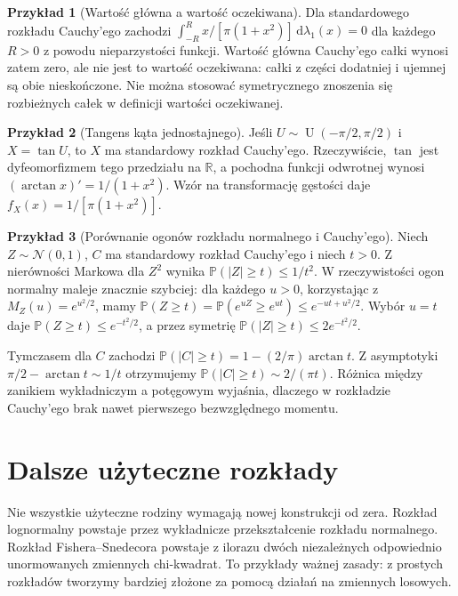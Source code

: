 \documentclass[11pt,a4paper,oneside]{report}
\numberwithin{equation}{chapter}
\theoremstyle{plain}
\theoremstyle{definition}
\newtheorem{przyklad}{Przykład}[chapter]
\theoremstyle{remark}
\newcommand{\R}{\mathbb{R}}
\newcommand{\Prob}{\mathbb{P}}
\newcommand{\dd}{\mathrm{d}}
\newcommand{\Unif}{\operatorname{U}}
\newcommand{\Normal}{\mathcal{N}}
\begin{document}
\begin{przyklad}[Wartość główna a wartość oczekiwana]
Dla standardowego rozkładu Cauchy'ego zachodzi
$\int_{-R}^{R}x/[\pi(1+x^2)]\,\dd\lambda_1(x)=0$
dla każdego $R>0$ z powodu nieparzystości funkcji.
Wartość główna Cauchy'ego całki wynosi zatem zero,
ale nie jest to wartość oczekiwana: całki z części dodatniej
i ujemnej są obie nieskończone. Nie można stosować
symetrycznego znoszenia się rozbieżnych całek w definicji
wartości oczekiwanej.
\end{przyklad}

\begin{przyklad}[Tangens kąta jednostajnego]
Jeśli $U\sim\Unif(-\pi/2,\pi/2)$ i $X=\tan U$,
to $X$ ma standardowy rozkład Cauchy'ego. Rzeczywiście,
$\tan$ jest dyfeomorfizmem tego przedziału na $\R$,
a pochodna funkcji odwrotnej wynosi
$(\arctan x)'=1/(1+x^2)$.
Wzór na transformację gęstości daje $f_X(x)=1/[\pi(1+x^2)]$.
\end{przyklad}


\begin{przyklad}[Porównanie ogonów rozkładu normalnego i Cauchy'ego]
Niech $Z\sim\Normal(0,1)$, $C$ ma standardowy rozkład
Cauchy'ego i niech $t>0$. Z nierówności Markowa
dla $Z^2$ wynika $\Prob(|Z|\geq t)\leq1/t^2$.
W rzeczywistości ogon normalny maleje znacznie szybciej:
dla każdego $u>0$, korzystając z
$M_Z(u)=e^{u^2/2}$, mamy
$\Prob(Z\geq t)=\Prob(e^{uZ}\geq e^{ut})
\leq e^{-ut+u^2/2}$.
Wybór $u=t$ daje $\Prob(Z\geq t)\leq e^{-t^2/2}$,
a przez symetrię $\Prob(|Z|\geq t)\leq2e^{-t^2/2}$.

Tymczasem dla $C$ zachodzi
$\Prob(|C|\geq t)=1-(2/\pi)\arctan t$.
Z asymptotyki $\pi/2-\arctan t\sim1/t$
otrzymujemy $\Prob(|C|\geq t)\sim 2/(\pi t)$.
Różnica między zanikiem wykładniczym a potęgowym
wyjaśnia, dlaczego w rozkładzie Cauchy'ego brak nawet
pierwszego bezwzględnego momentu.
\end{przyklad}

\section{Dalsze użyteczne rozkłady}
Nie wszystkie użyteczne rodziny wymagają nowej konstrukcji od zera.
Rozkład lognormalny powstaje przez wykładnicze przekształcenie
rozkładu normalnego. Rozkład Fishera--Snedecora powstaje z ilorazu
dwóch niezależnych odpowiednio unormowanych zmiennych chi-kwadrat.
To przykłady ważnej zasady: z prostych rozkładów tworzymy
bardziej złożone za pomocą działań na zmiennych losowych.
\end{document}
